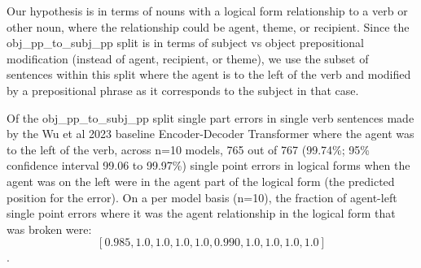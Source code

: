 \documentclass[11pt]{article}
\begin{document}


Our hypothesis is in terms of nouns with a logical form relationship to a verb or other noun, where the relationship could be agent, theme, or recipient.
Since the obj\_pp\_to\_subj\_pp split is in terms of subject vs object prepositional modification (instead of agent, recipient, or theme), we use the subset of sentences within this split where the agent is to the left of the verb and modified by a prepositional phrase as it corresponds to the subject in that case.

Of the obj\_pp\_to\_subj\_pp split single part errors in single verb sentences made by the Wu et al 2023 baseline Encoder-Decoder Transformer where the agent was to the left of the verb, 
across n=10 models, 765 out of 767 (99.74\%; 95\% confidence interval 99.06 to 99.97\%) single point errors in logical forms when the agent was on the left were in the agent part of the logical form (the predicted position for the error). On a per model basis (n=10), the fraction of agent-left single point errors where it was the agent relationship in the logical form that was broken were: $$[0.985, 1.0, 1.0, 1.0, 1.0, 0.990, 1.0, 1.0, 1.0, 1.0]$$.
\end{document}
